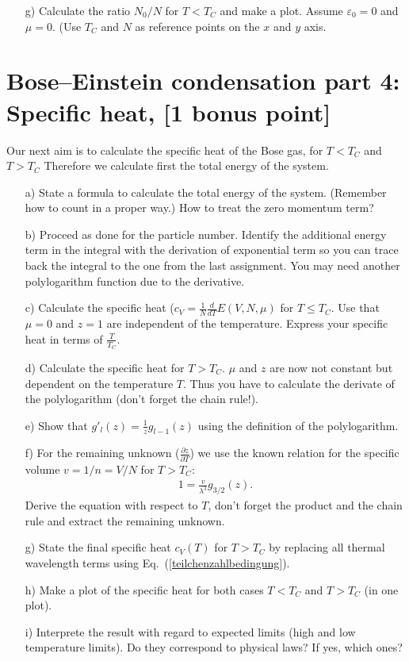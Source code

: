 \documentclass[12pt,a4paper]{article} %
\begin{document}
\begin{itemize}
 \item[g)] Calculate the ratio $N_0/N$ for $T < T_C$ and make a plot. Assume $\varepsilon_0 = 0$ and $\mu = 0$. (Use $T_C$ and $N$ as reference points on the $x$ and $y$ axis.
\end{itemize}


\section{Bose--Einstein condensation part 4: Specific heat, [1 bonus point]}
Our next aim is to calculate the specific heat of the Bose gas, for $T< T_C$ and $T>T_C$
Therefore we calculate first the total energy of the system.

\begin{itemize}
 \item[a)] State a formula to calculate the total energy of the system. (Remember how to count in a proper way.) How to treat the zero momentum term?
 \item[b)] Proceed as done for the particle number. Identify the additional energy term in the integral with the derivation of exponential term so you can trace back the integral to the one from the last assignment. You may need another polylogarithm function due to the derivative.
 \item[c)] Calculate the specific heat ($c_V = \frac{1}{N} \frac{d}{dT} E(V,N,\mu)$ for $T \leq T_C$. Use that $\mu = 0$ and $z = 1$ are independent of the temperature.
 Express your specific heat in terms of $\frac{T}{T_C}$.
 \item[d)] Calculate the specific heat for $T > T_C$. $\mu$ and $z$ are now not constant but dependent on the temperature $T$. Thus you have to calculate the derivate of the polylogarithm (don't forget the chain rule!).
 \item[e)] Show that $g'_{l}(z) = \frac{1}{z} g_{l-1}(z)$ using the definition of the polylogarithm.
 \item[f)] For the remaining unknown ($\frac{\partial z}{\partial T}$) we use the known relation for the specific volume $v = 1/n = V/N$ for $T> T_C$:
 \begin{align}
 1 = \frac{v}{\lambda^3}g_{3/2}(z). \label{teilchenzahlbedingung}
 \end{align}
 Derive the equation with respect to $T$, don't forget the product and the chain rule and extract the remaining unknown.
 \item[g)] State the final specific heat $c_V(T)$ for $T>T_C$ by replacing all thermal wavelength terms using Eq.~(\ref{teilchenzahlbedingung}).
 \item[h)] Make a plot of the specific heat for both cases $T< T_C$ and $T>T_C$ (in one plot). 
 \item[i)] Interprete the result with regard to expected limits (high and low temperature limits). Do they correspond to physical laws? If yes, which ones?
  \end{itemize}
\end{document}
